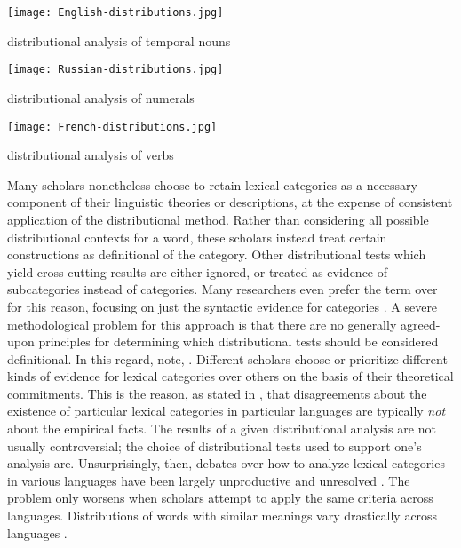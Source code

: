\begin{table}[h!]
  \texttt{[image: English-distributions.jpg]}
  \caption[distributional analysis of English temporal nouns]{distributional analysis of  temporal nouns \parencite[54]{Crystal1967}}
  \label{tab:English-distributions-b}
\end{table}

\begin{table}[h!]
  \texttt{[image: Russian-distributions.jpg]}
  \caption[distributional analysis of Russian numerals]{distributional analysis of  numerals \parencite[359]{Corbett1978}}
  \label{tab:Russian-distributions}
\end{table}

\begin{table}[h!]
  \texttt{[image: French-distributions.jpg]}
  \caption[distributional analysis of French verbs]{distributional analysis of  verbs \parencite[860]{Gross1979}}
  \label{tab:French-distributions}
\end{table}

Many scholars nonetheless choose to retain lexical categories as a necessary component of their linguistic theories or descriptions, at the expense of consistent application of the distributional method. Rather than considering all possible distributional contexts for a word, these scholars instead treat certain constructions as definitional of the category. Other distributional tests which yield cross-cutting results are either ignored, or treated as evidence of subcategories instead of categories. Many researchers even prefer the term  over  for this reason, focusing on just the syntactic evidence for categories \parencites{Baker2003}{Rauh2010}. A severe methodological problem for this approach is that there are no generally agreed-upon principles for determining which distributional tests should be considered definitional. In this regard, \textcite[4]{SchachterShopen2007} note,  . Different scholars choose or prioritize different kinds of evidence for lexical categories over others on the basis of their theoretical commitments. This is the reason, as stated in , that disagreements about the existence of particular lexical categories in particular languages are typically \emph{not} about the empirical facts. The results of a given distributional analysis are not usually controversial; the choice of distributional tests used to support one's analysis are. Unsurprisingly, then, debates over how to analyze lexical categories in various languages have been largely unproductive and unresolved \parencite[435]{Croft2005}. The problem only worsens when scholars attempt to apply the same criteria across languages. Distributions of words with similar meanings vary drastically across languages \parencite[§1.4.1]{Croft2001b}.

